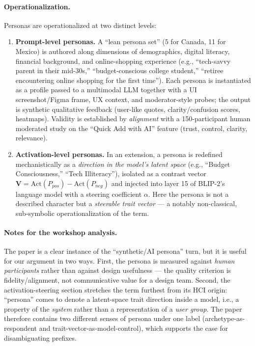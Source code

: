 \paragraph{Operationalization.}
Personas are operationalized at two distinct levels:
\begin{enumerate}
  \item \textbf{Prompt-level personas.} A ``lean persona set'' (5 for Canada,
  11 for Mexico) is authored along dimensions of demographics, digital literacy,
  financial background, and online-shopping experience (e.g., ``tech-savvy
  parent in their mid-30s,'' ``budget-conscious college student,''
  ``retiree encountering online shopping for the first time''). Each persona is
  instantiated as a profile passed to a multimodal LLM together with a UI
  screenshot/Figma frame, UX context, and moderator-style probes; the output is
  synthetic qualitative feedback (user-like quotes, clarity/confusion scores,
  heatmaps). Validity is established by \emph{alignment} with a 150-participant
  human moderated study on the ``Quick Add with AI'' feature (trust, control,
  clarity, relevance).
  \item \textbf{Activation-level personas.} In an extension, a persona is
  redefined mechanistically as a \emph{direction in the model's latent space}
  (e.g., ``Budget Consciousness,'' ``Tech Illiteracy''), isolated as a contrast
  vector $\mathbf{V} = \mathrm{Act}(P_{pos}) - \mathrm{Act}(P_{neg})$ and
  injected into layer 15 of BLIP-2's language model with a steering coefficient
  $\alpha$. Here the persona is not a described character but a
  \emph{steerable trait vector} --- a notably non-classical, sub-symbolic
  operationalization of the term.
\end{enumerate}

\paragraph{Notes for the workshop analysis.}
The paper is a clear instance of the ``synthetic/AI persona'' turn, but it is
useful for our argument in two ways. First, the persona is measured against
\emph{human participants} rather than against design usefulness --- the quality
criterion is fidelity/alignment, not communicative value for a design team.
Second, the activation-steering section stretches the term furthest from its HCI
origin: ``persona'' comes to denote a latent-space trait direction inside a
model, i.e., a property of the \emph{system} rather than a representation of a
\emph{user group}. The paper therefore contains two different senses of persona
under one label (archetype-as-respondent and trait-vector-as-model-control),
which supports the case for disambiguating prefixes.

